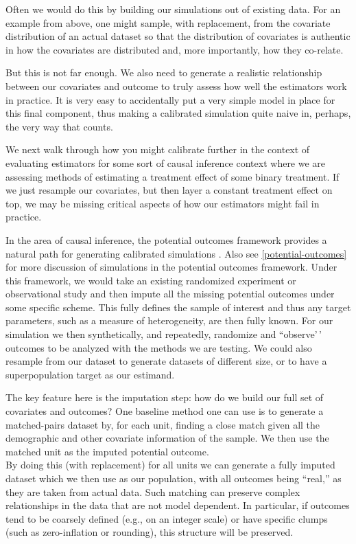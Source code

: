 \documentclass[
]{book}
\begin{document}
Often we would do this by building our simulations out of existing data.
For an example from above, one might sample, with replacement, from the covariate distribution of an actual dataset so that the distribution of covariates is authentic in how the covariates are distributed and, more importantly, how they co-relate.

But this is not far enough.
We also need to generate a realistic relationship between our covariates and outcome to truly assess how well the estimators work in practice.
It is very easy to accidentally put a very simple model in place for this final component, thus making a calibrated simulation quite naive in, perhaps, the very way that counts.

We next walk through how you might calibrate further in the context of evaluating estimators for some sort of causal inference context where we are assessing methods of estimating a treatment effect of some binary treatment.
If we just resample our covariates, but then layer a constant treatment effect on top, we may be missing critical aspects of how our estimators might fail in practice.

In the area of causal inference, the potential outcomes framework provides a natural path for generating calibrated simulations \citep{Kern2014calibrated}.
Also see \ref{potential-outcomes} for more discussion of simulations in the potential outcomes framework.
Under this framework, we would take an existing randomized experiment or observational study and then impute all the missing potential outcomes under some specific scheme.
This fully defines the sample of interest and thus any target parameters, such as a measure of heterogeneity, are then fully known.
For our simulation we then synthetically, and repeatedly, randomize and ``observe'\,' outcomes to be analyzed with the methods we are testing.
We could also resample from our dataset to generate datasets of different size, or to have a superpopulation target as our estimand.

The key feature here is the imputation step: how do we build our full set of covariates and outcomes?
One baseline method one can use is to generate a matched-pairs dataset by, for each unit, finding a close match given all the demographic and other covariate information of the sample. We then use the matched unit as the imputed potential outcome.\\
By doing this (with replacement) for all units we can generate a fully imputed dataset which we then use as our population, with all outcomes being ``real,'' as they are taken from actual data.
Such matching can preserve complex relationships in the data that are not model dependent.
In particular, if outcomes tend to be coarsely defined (e.g., on an integer scale) or have specific clumps (such as zero-inflation or rounding), this structure will be preserved.
\end{document}
